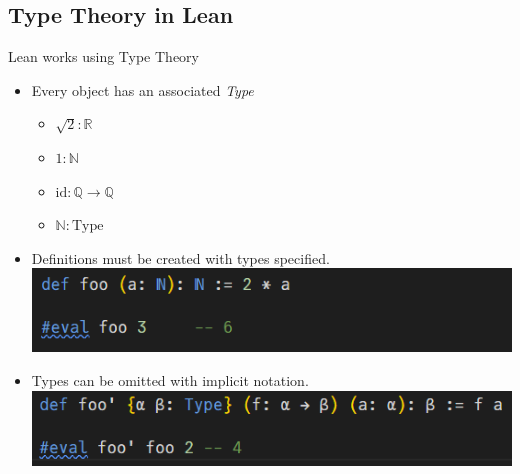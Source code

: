 \documentclass[svgnames]{beamer}
\begin{document}
\subsection{Type Theory in Lean}
\begin{frame}{Lean works using Type Theory}
\begin{itemize}[<+->]
    \item Every object has an associated \textit{Type}
    \begin{itemize}[<+->]
        \item $\sqrt 2: \mathbb R$ 
        \item $1: \mathbb N$ 
        \item $\text{id}: \mathbb Q \to \mathbb Q$ 
        \item $\mathbb N: \text{Type}$ 
    \end{itemize}
    \item Definitions must be created with types specified.
    \includegraphics[width=0.75\linewidth]{image.png}
    \item Types can be omitted with implicit notation.
    \includegraphics[width=0.75\linewidth]{image2.png}
\end{itemize}
\end{frame}
\end{document}
